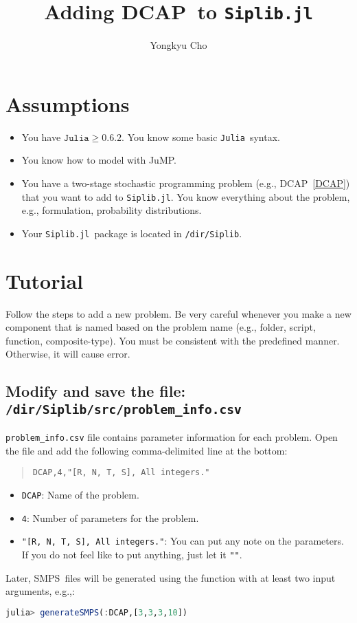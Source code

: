 \documentclass[11pt]{article}
\newcommand{\smps}{\textsf{SMPS}}
\newcommand{\jump}{\textsf{JuMP}}
\newcommand{\dcap}{\textsf{DCAP}}
\newcommand{\julia}{\texttt{Julia}}
\newcommand{\siplibjl}{\texttt{Siplib.jl}}
\begin{document}
\nocite{*}
\title{Adding \dcap\ to \siplibjl}
\author{Yongkyu Cho}
\maketitle
\section{Assumptions}
\begin{itemize}
	\item You have $\julia\ge 0.6.2$. You know some basic \julia\ syntax.
	\item You know how to model with \jump.
	\item You have a two-stage stochastic programming problem (e.g., \dcap\ \ref{DCAP}) that you want to add to \siplibjl. You know everything about the problem, e.g., formulation, probability distributions.
	\item Your \siplibjl\ package is located in \texttt{/dir/Siplib}.
\end{itemize}

\section{Tutorial}
Follow the steps to add a new problem. Be very careful whenever you make a new component that is named based on the problem name (e.g., folder, script, function, composite-type). You must be consistent with the predefined manner. Otherwise, it will cause error. 
\subsection{Modify and save the file: \texttt{/dir/Siplib/src/problem\_info.csv}}
\texttt{problem\_info.csv} file contains parameter information for each problem. Open the file and add the following comma-delimited line at the bottom:
\begin{quote}\noindent\centering \texttt{DCAP,4,"[R, N, T, S], All integers."}\end{quote}
\begin{itemize}
	\item \texttt{DCAP}: Name of the problem.
	\item \texttt{4}: Number of parameters for the problem.
	\item \texttt{"[R, N, T, S], All integers."}: You can put any note on the parameters. If you do not feel like to put anything, just let it \texttt{""}.
\end{itemize}
Later, \smps\ files will be generated using the function with at least two input arguments, e.g.,: 
\begin{lstlisting}[frame=single,language=julia]
julia> generateSMPS(:DCAP,[3,3,3,10])
\end{lstlisting}
\end{document}
